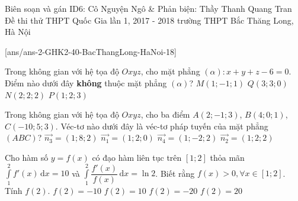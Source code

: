\begin{name}
{Biên soạn và gán ID6: Cô Nguyện Ngô \& Phản biện: Thầy Thanh Quang Tran}
{Đề thi thử THPT Quốc Gia lần 1, 2017 - 2018 trường THPT Bắc Thăng Long, Hà Nội}
\end{name}
\setcounter{ex}{0}
[ans/ans-2-GHK2-40-BacThangLong-HaNoi-18]
\begin{ex}%
Trong không gian với hệ tọa độ $Oxyz$, cho mặt phẳng $(\alpha): x+y+z-6=0$. Điểm nào dưới đây \textbf{không} thuộc mặt phẳng $(\alpha)$?
\choice
{\True $M(1; -1; 1)$}
{$Q(3; 3; 0)$}
{$N(2; 2; 2)$}
{$P(1; 2; 3)$}
\end{ex}

\begin{ex}%
Trong không gian với hệ tọa độ $Oxyz$, cho ba điểm $A(2; -1; 3)$, $B(4; 0; 1)$, $C(-10; 5; 3)$. Véc-tơ nào dưới đây là véc-tơ pháp tuyến của mặt phẳng $(ABC)$?
\choice
{$\vec{n_3}=(1; 8; 2)$}
{$\vec{n_1}=(1; 2; 0)$}
{$\vec{n_4}=(1; -2; 2)$}
{\True $\vec{n_2}=(1; 2; 2)$}
\end{ex}

\begin{ex}%
Cho hàm số $y=f(x)$ có đạo hàm liên tục trên $[1; 2]$ thỏa mãn $\displaystyle\int \limits_{1}^{2}f'(x)\mathrm{\,d}x=10$ và
$\displaystyle\int \limits_{1}^{2}\dfrac{f'(x)}{f(x)}\mathrm{\,d}x=\ln 2$. Biết rằng $f(x)>0, \forall x\in [1; 2]$. Tính $f(2)$.
\choice
{$f(2)=-10$}
{$f(2)=10$}
{$f(2)=-20$}
{\True $f(2)=20$}
\end{ex}

